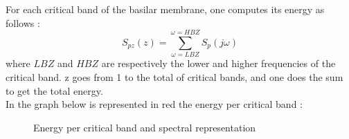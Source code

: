 For each critical band of the basilar membrane, one computes its energy as follows :
$$S_{pz}(z) = \sum_{\omega = LBZ}^{\omega = HBZ}S_p(j\omega)$$
where $LBZ$ and $HBZ$ are respectively the lower and higher frequencies of the critical band. z goes from 1 to the total of critical bands, and one does the sum to get the total energy.\\
In the graph below is represented in red the energy per critical band :
\begin{figure}[H]
\caption{Energy per critical band and spectral representation}
\end{figure}

